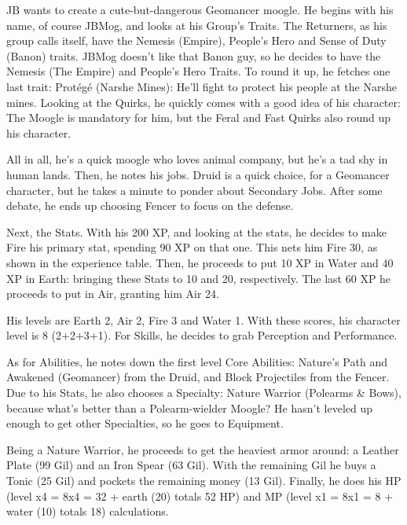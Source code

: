 \begin{multimog}
JB wants to create a cute-but-dangerous Geomancer moogle. He begins with his name, of course JBMog, and looks at his Group's Traits. The Returners, as his group calls itself, have the Nemesis (Empire), People's Hero and Sense of Duty (Banon) traits. JBMog doesn't like that Banon guy, so he decides to have the Nemesis (The Empire) and People's Hero Traits. To round it up, he fetches one last trait: Prot\'eg\'e (Narshe Mines): He'll fight to protect his people at the Narshe mines. Looking at the Quirks, he quickly comes with a good idea of his character: The Moogle is mandatory for him, but the Feral and Fast Quirks also round up his character.

All in all, he's a quick moogle who loves animal company, but he's a tad shy in human lands. Then, he notes his jobs. Druid is a quick choice, for a Geomancer character, but he takes a minute to ponder about Secondary Jobs. After some debate, he ends up choosing Fencer to focus on the defense.

Next, the Stats. With his 200 XP, and looking at the stats, he decides to make Fire his primary stat, spending 90 XP on that one. This nets him Fire 30, as shown in the experience table. Then, he proceeds to put 10 XP in Water and 40 XP in Earth: bringing these Stats to 10 and 20, respectively. The last 60 XP he proceeds to put in Air, granting him Air 24.

His levels are Earth 2, Air 2, Fire 3 and Water 1. With these scores, his character level is 8 (2+2+3+1). For Skills, he decides to grab Perception and Performance.

As for Abilities, he notes down the first level Core Abilities: Nature's Path and Awakened (Geomancer) from the Druid, and Block Projectiles from the Fencer. Due to his Stats, he also chooses a Specialty: Nature Warrior (Polearms \& Bows), because what’s better than a Polearm-wielder Moogle? He hasn't leveled up enough to get other Specialties, so he goes to Equipment.

Being a Nature Warrior, he proceeds to get the heaviest armor around: a Leather Plate (99 Gil) and an Iron Spear (63 Gil). With the remaining Gil he buys a Tonic (25 Gil) and pockets the remaining money (13 Gil). Finally, he does his HP (level x4 = 8x4 = 32 + earth (20) totals 52 HP) and MP (level x1 = 8x1 = 8 + water (10) totals 18) calculations.


\end{multimog}

